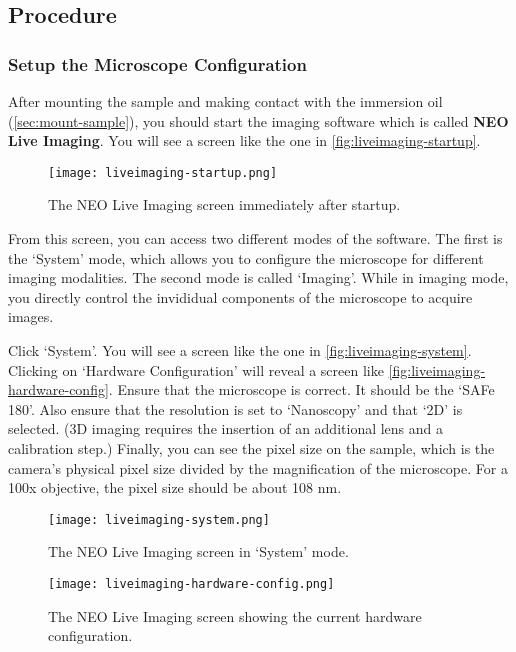 \documentclass[10pt,a4paper,oneside]{book}
\begin{document}
\subsection{Procedure}

\subsubsection{Setup the Microscope Configuration}

After mounting the sample and making contact with the immersion oil (\ref{sec:mount-sample}), you should start the imaging software which is called \textbf{NEO Live Imaging}. You will see a screen like the one in \autoref{fig:liveimaging-startup}.

\begin{figure}[ht]
    \centering
    \texttt{[image: liveimaging-startup.png]}
    \caption{The NEO Live Imaging screen immediately after startup.}
    \label{fig:liveimaging-startup}
\end{figure}

From this screen, you can access two different modes of the software. The first is the `System' mode, which allows you to configure the microscope for different imaging modalities. The second mode is called `Imaging'. While in imaging mode, you directly control the invididual components of the microscope to acquire images.

Click `System'. You will see a screen like the one in \autoref{fig:liveimaging-system}. Clicking on `Hardware Configuration' will reveal a screen like \autoref{fig:liveimaging-hardware-config}. Ensure that the microscope is correct. It should be the `SAFe 180'. Also ensure that the resolution is set to `Nanoscopy' and that `2D' is selected. (3D imaging requires the insertion of an additional lens and a calibration step.) Finally, you can see the pixel size on the sample, which is the camera's physical pixel size divided by the magnification of the microscope. For a 100x objective, the pixel size should be about 108 nm.

\begin{figure}[ht]
    \centering
    \texttt{[image: liveimaging-system.png]}
    \caption{The NEO Live Imaging screen in `System' mode.}
    \label{fig:liveimaging-system}
\end{figure}

\begin{figure}[ht]
    \centering
    \texttt{[image: liveimaging-hardware-config.png]}
    \caption{The NEO Live Imaging screen showing the current hardware configuration.}
    \label{fig:liveimaging-hardware-config}
\end{figure}
\end{document}
